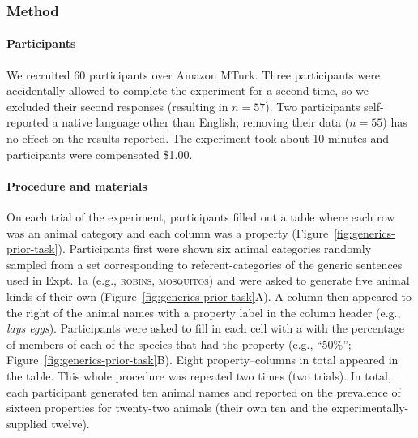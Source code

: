 \documentclass[english,,man,floatsintext]{apa6}
\let\oldparagraph\paragraph
\renewcommand{\paragraph}[1]{\oldparagraph{#1}\mbox{}}
\theoremstyle{definition}
\theoremstyle{definition}
\theoremstyle{definition}
\theoremstyle{remark}
\begin{document}
\hypertarget{method-1}{%
\subsubsection{Method}\label{method-1}}

\hypertarget{participants-1}{%
\paragraph{Participants}\label{participants-1}}

We recruited 60 participants over Amazon MTurk. Three participants were
accidentally allowed to complete the experiment for a second time, so we
excluded their second responses (resulting in \(n=57\)). Two
participants self-reported a native language other than English;
removing their data (\(n=55\)) has no effect on the results reported.
The experiment took about 10 minutes and participants were compensated
\$1.00.

\hypertarget{procedure-and-materials-1}{%
\paragraph{Procedure and materials}\label{procedure-and-materials-1}}

On each trial of the experiment, participants filled out a table where
each row was an animal category and each column was a property
(Figure~\ref{fig:generics-prior-task}). Participants first were shown
six animal categories randomly sampled from a set corresponding to
referent-categories of the generic sentences used in Expt. 1a (e.g.,
\textsc{robins, mosquitos}) and were asked to generate five animal kinds
of their own (Figure~\ref{fig:generics-prior-task}A). A column then
appeared to the right of the animal names with a property label in the
column header (e.g., \emph{lays eggs}). Participants were asked to fill
in each cell with a with the percentage of members of each of the
species that had the property (e.g., \enquote{50\%};
Figure~\ref{fig:generics-prior-task}B). Eight property--columns in total
appeared in the table. This whole procedure was repeated two times (two
trials). In total, each participant generated ten animal names and
reported on the prevalence of sixteen properties for twenty-two animals
(their own ten and the experimentally-supplied twelve).
\end{document}
